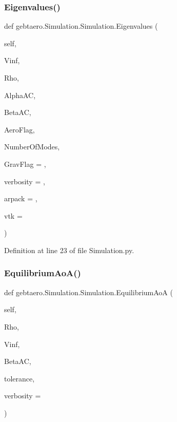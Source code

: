 \subsubsection{\texorpdfstring{Eigenvalues()}{Eigenvalues()}}
{\footnotesize\ttfamily def gebtaero.\+Simulation.\+Simulation.\+Eigenvalues (\begin{DoxyParamCaption}\item[{}]{self,  }\item[{}]{Vinf,  }\item[{}]{Rho,  }\item[{}]{Alpha\+AC,  }\item[{}]{Beta\+AC,  }\item[{}]{Aero\+Flag,  }\item[{}]{Number\+Of\+Modes,  }\item[{}]{Grav\+Flag = {},  }\item[{}]{verbosity = {},  }\item[{}]{arpack = {},  }\item[{}]{vtk = {} }\end{DoxyParamCaption})}



Definition at line 23 of file Simulation.\+py.

\mbox{\label{classgebtaero_1_1_simulation_1_1_simulation_a36a121ab1505362902de50041d6c2e5d}} 
\subsubsection{\texorpdfstring{Equilibrium\+Ao\+A()}{EquilibriumAoA()}}
{\footnotesize\ttfamily def gebtaero.\+Simulation.\+Simulation.\+Equilibrium\+AoA (\begin{DoxyParamCaption}\item[{}]{self,  }\item[{}]{Rho,  }\item[{}]{Vinf,  }\item[{}]{Beta\+AC,  }\item[{}]{tolerance,  }\item[{}]{verbosity = {} }\end{DoxyParamCaption})}



